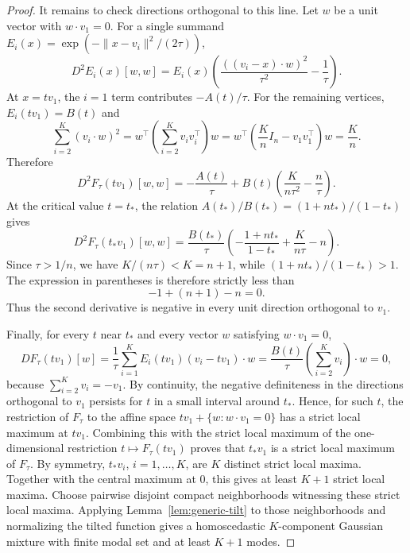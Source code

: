 \documentclass[11pt]{article}
\theoremstyle{plain}
\theoremstyle{definition}
\theoremstyle{remark}
\numberwithin{equation}{section}
\begin{document}
\begin{proof}
It remains to check directions orthogonal to this line. Let $w$ be a unit vector with $w\cdot v_1=0$. For a single summand $E_i(x)=\exp(-\|x-v_i\|^2/(2\tau))$,
\[
D^2E_i(x)[w,w]
=E_i(x)\left(\frac{((v_i-x)\cdot w)^2}{\tau^2}-\frac{1}{\tau}\right).
\]
At $x=tv_1$, the $i=1$ term contributes $-A(t)/\tau$. For the remaining vertices, $E_i(tv_1)=B(t)$ and
\[
\sum_{i=2}^K (v_i\cdot w)^2
=w^\top\left(\sum_{i=2}^K v_iv_i^\top\right)w
=w^\top\left(\frac{K}{n}I_n-v_1v_1^\top\right)w
=\frac{K}{n}.
\]
Therefore
\[
D^2F_\tau(tv_1)[w,w]
=-\frac{A(t)}{\tau}+B(t)\left(\frac{K}{n\tau^2}-\frac{n}{\tau}\right).
\]
At the critical value $t=t_\ast$, the relation $A(t_\ast)/B(t_\ast)=(1+nt_\ast)/(1-t_\ast)$ gives
\[
D^2F_\tau(t_\ast v_1)[w,w]
=\frac{B(t_\ast)}{\tau}
\left(-\frac{1+nt_\ast}{1-t_\ast}+\frac{K}{n\tau}-n\right).
\]
Since $\tau>1/n$, we have $K/(n\tau)<K=n+1$, while $(1+nt_\ast)/(1-t_\ast)>1$. The expression in parentheses is therefore strictly less than
\[
-1+(n+1)-n=0.
\]
Thus the second derivative is negative in every unit direction orthogonal to $v_1$.

Finally, for every $t$ near $t_\ast$ and every vector $w$ satisfying $w\cdot v_1=0$,
\[
DF_\tau(tv_1)[w]
=\frac{1}{\tau}\sum_{i=1}^K E_i(tv_1)(v_i-tv_1)\cdot w
=\frac{B(t)}{\tau}\left(\sum_{i=2}^K v_i\right)\cdot w=0,
\]
because $\sum_{i=2}^K v_i=-v_1$. By continuity, the negative definiteness in the directions orthogonal to $v_1$ persists for $t$ in a small interval around $t_\ast$. Hence, for such $t$, the restriction of $F_\tau$ to the affine space $tv_1+\{w:w\cdot v_1=0\}$ has a strict local maximum at $tv_1$. Combining this with the strict local maximum of the one-dimensional restriction $t\mapsto F_\tau(tv_1)$ proves that $t_\ast v_1$ is a strict local maximum of $F_\tau$. By symmetry, $t_\ast v_i$, $i=1,\dots,K$, are $K$ distinct strict local maxima. Together with the central maximum at $0$, this gives at least $K+1$ strict local maxima. Choose pairwise disjoint compact neighborhoods witnessing these strict local maxima. Applying Lemma~\ref{lem:generic-tilt} to those neighborhoods and normalizing the tilted function gives a homoscedastic $K$-component Gaussian mixture with finite modal set and at least $K+1$ modes.
\end{proof}
\end{document}

